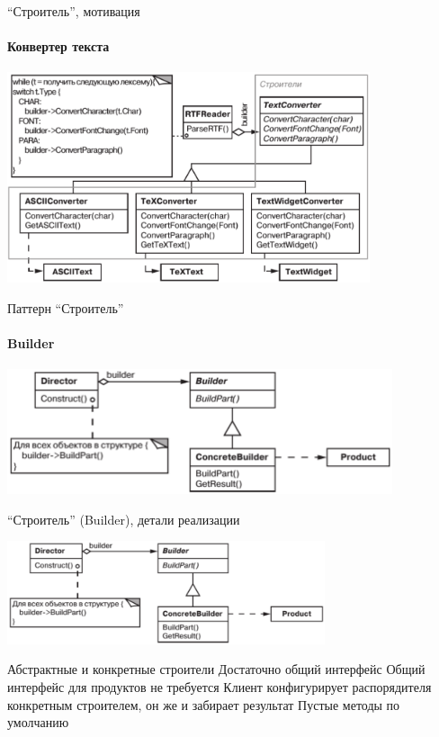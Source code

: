 \documentclass{../../slides-style}
\begin{document}
    \begin{frame}{\enquote{Строитель}, мотивация}
        \framesubtitle{Конвертер текста}
        \begin{center}
            \includegraphics[width=0.8\textwidth]{textConverter.png}
        \end{center}
    \end{frame}

    \begin{frame}{Паттерн \enquote{Строитель}}
        \framesubtitle{Builder}
        \begin{center}
            \includegraphics[width=0.85\textwidth]{builder.png}
        \end{center}
    \end{frame}
    
    \begin{frame}{\enquote{Строитель} (Builder), детали реализации}
        \begin{center}
            \includegraphics[width=0.7\textwidth]{builder.png}
        \end{center}
        \begin{outline}
            \1 Абстрактные и конкретные строители
                \2 Достаточно общий интерфейс
            \1 Общий интерфейс для продуктов не требуется
                \2 Клиент конфигурирует распорядителя конкретным строителем, он же и забирает результат
            \1 Пустые методы по умолчанию
        \end{outline}
    \end{frame}
\end{document}
